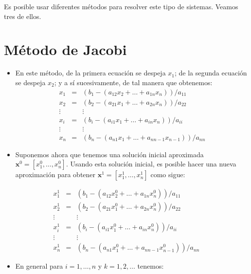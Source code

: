 \documentclass[
  letterpaper,
  DIV=11,
  numbers=noendperiod]{scrreprt}
\providecommand{\tightlist}{%
  \setlength{\itemsep}{0pt}\setlength{\parskip}{0pt}}\usepackage{longtable,booktabs,array}
\begin{document}
Es posible usar diferentes métodos para resolver este tipo de sistemas.
Veamos tres de ellos.


\chapter{Método de Jacobi}\label{muxe9todo-de-jacobi}

\begin{itemize}
\item
  En este método, de la primera ecuación se despeja \(x_1\); de la
  segunda ecuación se despeja \(x_2\); y a sí sucesivamente, de tal
  manera que obtenemos: \[
  \begin{eqnarray*}
    x_1 & = &\left( b_1 - (a_{12}x_2 +  \dots  + a_{1n}x_n) \right) / a_{11}  \\
    x_2 & = &\left( b_2 - (a_{21}x_1 +  \dots  + a_{2n}x_n) \right) / a_{22} \\
    \vdots & & \vdots \\
    x_i & = &\left( b_i - (a_{i1}x_1 +  \dots  + a_{in}x_n) \right) / a_{ii} \\
    \vdots & & \vdots \\
    x_n & = &\left( b_n - (a_{n1}x_1 +  \dots  + a_{nn-1}x_{n-1}) \right) / a_{nn}
  \end{eqnarray*}
  \]
\item
  Suponemos ahora que tenemos una solución inicial aproximada
  \(\mathbf{x}^0 = [x_1^0, \dots, x_n^0]\). Usando esta solución
  inicial, es posible hacer una nueva aproximación para obtener
  \(\mathbf{x}^1 = [x_1^1, \dots, x_n^1]\) como sigue:
\end{itemize}

\[
\begin{eqnarray*}
    x_1^1 & = &\left( b_1 - (a_{12}x_2^0 +  \dots  + a_{1n}x_n^0) \right) / a_{11}  \\
    x_2^1 & = &\left( b_2 - (a_{21}x_1^0 +  \dots  + a_{2n}x_n^0) \right) / a_{22} \\
    \vdots & & \vdots \\
    x_i^1 & = &\left( b_i - (a_{i1}x_1^0 +  \dots  + a_{in}x_n^0) \right) / a_{ii} \\
    \vdots & & \vdots \\
    x_n^1 & = &\left( b_n - (a_{n1}x_1^0 +  \dots  + a_{nn-1}x_{n-1}^0) \right) / a_{nn}
\end{eqnarray*}
\]

\begin{itemize}
\tightlist
\item
  En general para \(i = 1, \dots, n\) y \(k = 1, 2, \dots\) tenemos:
\end{itemize}
\end{document}
